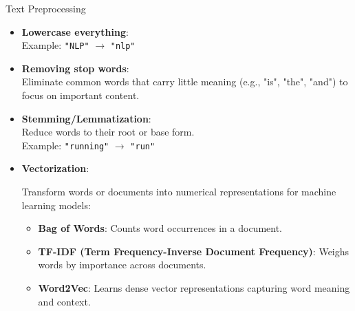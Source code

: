 \begin{frame}{Text Preprocessing}
    \begin{itemize}
        \item \textbf{Lowercase everything}: \\
        {\small Example: \texttt{"NLP"} $\rightarrow$ \texttt{"nlp"}}
        \item \textbf{Removing stop words}: \\
        {\small Eliminate common words that carry little meaning (e.g., "is", "the", "and") to focus on important content.}
        \item \textbf{Stemming/Lemmatization}: \\
        {\small Reduce words to their root or base form. \\
        Example: \texttt{"running"} $\rightarrow$ \texttt{"run"}}
        \item \textbf{Vectorization}: \\
        {\small Transform words or documents into numerical representations for machine learning models:
        \begin{itemize}
            \item \textbf{Bag of Words}: Counts word occurrences in a document.
            \item \textbf{TF-IDF (Term Frequency-Inverse Document Frequency)}: Weighs words by importance across documents.
            \item \textbf{Word2Vec}: Learns dense vector representations capturing word meaning and context.
        \end{itemize}}
    \end{itemize}
\end{frame}

